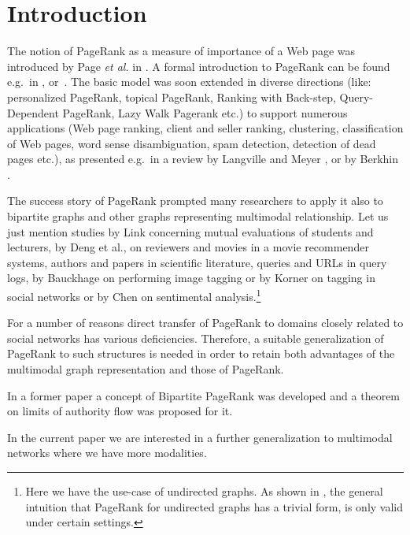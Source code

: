 \documentclass{fundam}
\newcommand{\citep}{\cite}
\begin{document}
\section{Introduction}

The notion of PageRank as a measure of importance of a Web page was introduced by Page \emph{et al.} in \citep{Page:1999}.
A formal introduction to PageRank can be found e.g.\  in \cite{Brezinski:2006}, or~\cite{WK11}.
The basic model was soon extended in diverse directions (like: personalized PageRank, topical PageRank, Ranking with Back-step, Query-Dependent PageRank, Lazy Walk Pagerank etc.) to support   numerous applications (Web page ranking, client and seller ranking, clustering, classification of Web pages, word sense disambiguation, spam detection, detection of dead pages etc.), as presented e.g.\  in a review   by  Langville and Meyer
\citep{LM06}, or by Berkhin \citep{Berkhin05asurvey}.

The success story of PageRank prompted many researchers to apply it also to bipartite graphs and other graphs representing multimodal relationship. Let us just mention studies by Link \citep{Link:2011}
concerning mutual evaluations of students and lecturers, by Deng et al., \citep{DLK09} on
reviewers and movies in a movie recommender systems, authors and papers in scientific literature, queries and URLs in query logs,
by Bauckhage  \citep{Bauckhage:2008} on performing image tagging or by Korner \cite{Korner:2010} on tagging in social networks or by Chen \cite{Chen:2015} on sentimental analysis.\footnote{Here we have the use-case of undirected graphs. As shown in \cite{Grolmusz:2012:undirectedPR}, the general intuition that PageRank for undirected graphs has a trivial form, is only valid under certain settings.}

For a number of reasons direct  transfer of PageRank to domains closely related to social networks has various deficiencies.
Therefore, a suitable generalization of PageRank to such structures is needed in order to retain both advantages of the multimodal graph representation and those of PageRank.

In a former paper \cite{Bipartite:2016}
a concept of Bipartite PageRank was developed and a theorem on limits of authority flow was proposed for it.

In the current paper we are interested in a further generalization to multimodal networks where we have more modalities.
\end{document}
